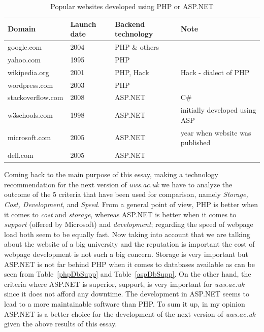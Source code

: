 \documentclass[11]{article}
\begin{document}
		\begin{table}[H]
			\caption{Popular websites developed using PHP or ASP.NET}
			\label{websitesTech}
			  \centering
				\begin{tabular}{|l|l|l|l|}
					\hline
					\textbf{Domain} & \textbf{Launch date} & \textbf{Backend technology} & \textbf{Note}\\
					\hline
					google.com  & 2004 & PHP \& others & \\
					\hline 
					yahoo.com & 1995 & PHP  & \\
					\hline 
					wikipedia.org & 2001 & PHP, Hack  & Hack - dialect of PHP \\
					\hline 
					wordpress.com & 2003 & PHP & \\
					\hline 
					stackoverflow.com & 2008 & ASP.NET  & C\# \\
					\hline 
					w3schools.com & 1998 & ASP.NET  & initially developed using ASP  \\
					\hline 
					microsoft.com & 2005 & ASP.NET  & year when website was published  \\
					\hline 
					dell.com & 2005 & ASP.NET  & \\
					\hline 
				\end{tabular}

		\end{table}
\indent
	Coming back to the main purpose of this essay, making a technology recommendation for the next version of \textit{uws.ac.uk} we have to analyze the outcome of the 5 criteria that have been used for comparison, namely \textit{Storage, Cost, Development,} and \textit{Speed}. From a general point of view, PHP is better when it comes to \textit{cost} and \textit{storage}, whereas ASP.NET is better when it comes to \textit{support} (offered by Microsoft) and \textit{development}; regarding the speed of webpage load both seem to be equally fast. Now taking into account that we are talking about the website of a big university and the reputation is important the cost of webpage development is not such a big concern. Storage is very important but ASP.NET is not far behind PHP when it comes to databases available as can be seen from Table~\ref{phpDbSupp} and Table~\ref{aspDbSupp}. On the other hand, the criteria where ASP.NET is superior, support, is very important for \textit{uws.ac.uk} since it does not afford any downtime. The development in ASP.NET seems to lead to a more maintainable software than PHP. To sum it up, in my opinion ASP.NET is a better choice for the development of the next version of \textit{uws.ac.uk} given the above results of this essay. 

\pagebreak



\end{document}
